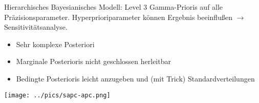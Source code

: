 \documentclass[german]{beamer}
\numberwithin{Bsp}{section}
\numberwithin{Def}{section}
\numberwithin{Stz}{section}
\begin{document}
\begin{frame}{Hierarchisches Bayesianisches Modell: Level 3}
Gamma-Prioris auf alle Präzisionsparameter. Hyperprioriparameter können Ergebnis beeinflußen $\to$ Sensitivitätsanalyse.

\begin{itemize}
\item Sehr komplexe Posteriori
\item Marginale Posterioris nicht geschlossen herleitbar
\item Bedingte Posterioris leicht anzugeben und (mit Trick) Standardverteilungen
\end{itemize}
\end{frame}

\begin{frame}
\begin{center}
\texttt{[image: ../pics/sapc-apc.png]}
\end{center}
\end{frame}
\begin{frame}
\begin{center}
\end{center}
\end{frame}
\end{document}
